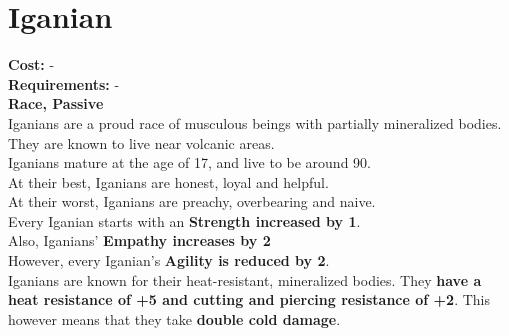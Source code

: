 \section{Iganian}
\textbf{Cost:} -\\
\textbf{Requirements:} -\\
\textbf{Race, Passive}\\
Iganians are a proud race of musculous beings with partially mineralized bodies. They are known to live near volcanic areas.\\
Iganians mature at the age of 17, and live to be around 90.\\
At their best, Iganians are honest, loyal and helpful.\\
At their worst, Iganians are preachy, overbearing and naive.\\
Every Iganian starts with an \textbf{Strength increased by 1}.\\
Also, Iganians' \textbf{Empathy increases by 2}\\
However, every Iganian's \textbf{Agility is reduced by 2}.\\
Iganians are known for their heat-resistant, mineralized bodies. They \textbf{have a heat resistance of +5 and cutting and piercing resistance of +2}. This however means that they take \textbf{double cold damage}.\\